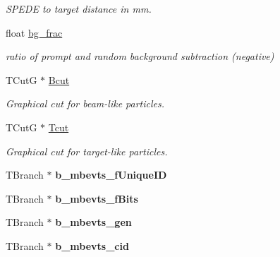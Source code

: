 \begin{DoxyCompactItemize}
\begin{DoxyCompactList}\small\item\em S\-P\-E\-D\-E to target distance in mm. \end{DoxyCompactList}\item 
\hypertarget{classg__clx_ad9d34b2f15cdb59de8b46f1f68280c5c}{float \hyperlink{classg__clx_ad9d34b2f15cdb59de8b46f1f68280c5c}{bg\-\_\-frac}}\label{classg__clx_ad9d34b2f15cdb59de8b46f1f68280c5c}

\begin{DoxyCompactList}\small\item\em ratio of prompt and random background subtraction (negative) \end{DoxyCompactList}\item 
\hypertarget{classg__clx_a626bb40b10360e2572d0c489a0cde2ad}{T\-Cut\-G $\ast$ \hyperlink{classg__clx_a626bb40b10360e2572d0c489a0cde2ad}{Bcut}}\label{classg__clx_a626bb40b10360e2572d0c489a0cde2ad}

\begin{DoxyCompactList}\small\item\em Graphical cut for beam-\/like particles. \end{DoxyCompactList}\item 
\hypertarget{classg__clx_a5607f06b4881cc2843fd2b9c9c16b35b}{T\-Cut\-G $\ast$ \hyperlink{classg__clx_a5607f06b4881cc2843fd2b9c9c16b35b}{Tcut}}\label{classg__clx_a5607f06b4881cc2843fd2b9c9c16b35b}

\begin{DoxyCompactList}\small\item\em Graphical cut for target-\/like particles. \end{DoxyCompactList}\item 
\hypertarget{classg__clx_ada0e05bae03e42e14c8e8494122a1709}{T\-Branch $\ast$ {\bfseries b\-\_\-mbevts\-\_\-f\-Unique\-I\-D}}\label{classg__clx_ada0e05bae03e42e14c8e8494122a1709}

\item 
\hypertarget{classg__clx_ad19ba31973ff37f5351edf88f4dbf5aa}{T\-Branch $\ast$ {\bfseries b\-\_\-mbevts\-\_\-f\-Bits}}\label{classg__clx_ad19ba31973ff37f5351edf88f4dbf5aa}

\item 
\hypertarget{classg__clx_abfc7aed653b54224fb7ae61efd081de6}{T\-Branch $\ast$ {\bfseries b\-\_\-mbevts\-\_\-gen}}\label{classg__clx_abfc7aed653b54224fb7ae61efd081de6}

\item 
\hypertarget{classg__clx_a4b7eebd7443d5a9058d4c21aca44e6bc}{T\-Branch $\ast$ {\bfseries b\-\_\-mbevts\-\_\-cid}}\label{classg__clx_a4b7eebd7443d5a9058d4c21aca44e6bc}


\end{DoxyCompactItemize}
